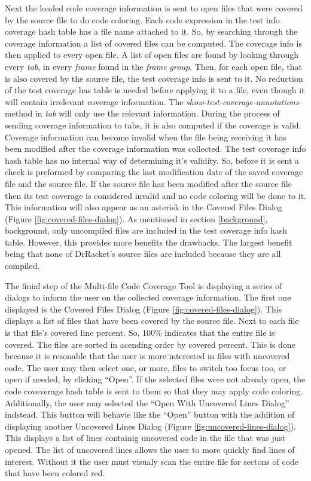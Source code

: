 Next the loaded code coverage information is sent to open files that were covered by the source file to do code coloring. Each code expression in the test info coverage hash table has a file name attached to it. So, by searching through the coverage information a list of covered files can be computed. The coverage info is then applied to every open file. A list of open files are found by looking through every \emph{tab}, in every \emph{frame} found in the \emph{frame group}. Then, for each open file, that is also covered by the source file, the test coverage info is sent to it. No reduction of the test coverage has table is needed before applying it to a file, even though it will contain irrelevant coverage information. The \emph{show-test-coverage-annotations} method in \emph{tab} will only use the relevant information. During the process of sending coverage information to tabs, it is also computed if the coverage is valid. Coverage information can become invalid when the file being receiving it has been modified after the coverage information was collected. The test coverage info hash table has no internal way of determining it's validity. So, before it is sent a check is preformed by comparing the last modification date of the saved coverage file and the source file. If the source file has been modified after the source file then its test coverage is considered invalid and no code coloring will be done to it. This information will also appear as an asterisk in the Covered Files Dialog (Figure \ref{fig:covered-files-dialog}). As mentioned in section \ref{background}, background, only uncompiled files are included in the test coverage info hash table. However, this provides more benefits the drawbacks. The largest benefit being that none of DrRacket's source files are included because they are all compiled.


The finial step of the Multi-file Code Coverage Tool is displaying a series of dialogs to inform the user on the collected coverage information. The first one displayed is the Covered Files Dialog (Figure \ref{fig:covered-files-dialog}). This displays a list of files that have been covered by the source file. Next to each file is that file's covered line percent. So, 100\% indicates that the entire file is covered. The files are sorted in acending order by covered percent. This is done because it is resonable that the user is more interested in files with uncovered code. The user may then select one, or more, files to switch too focus too, or open if needed, by clicking ``Open''. If the selected files were not already open, the code coveverage hash table is sent to them so that they may apply code coloring. Additionally, the user may selected the ``Open With Uncovered Lines Dialog'' indstead. This button will behavie like the ``Open'' button with the addition of displaying another Uncovered Lines Dialog (Figure \ref{fig:uncovered-lines-dialog}). This displays a list of lines containig uncovered code in the file that was just opened. The list of uncovered lines allows the user to more quickly find lines of interest. Without it the user must visualy scan the entire file for sectons of code that have been colored red.

